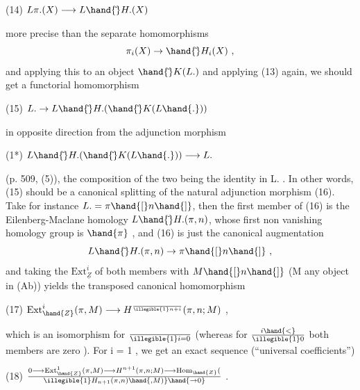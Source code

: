 
(14) \qquad $L\pi.(X) \longrightarrow L\hand{\tilde{}}H.(X)$

more precise than the separate homomorphisms
\[ \pi_i(X) \to \hand{\tilde{}}H_i(X) \ , \]
and applying this to an object $\hand{\tilde{}}K(L.)$ and applying (13) again, we should
get a functorial homomorphism

(15) \qquad $L. \to L\hand{\tilde{}}H.(\hand{\tilde{}}K(L\hand{.}))$

in opposite direction from the adjunction morphism

(1*) \qquad $L\hand{\tilde{}}H.(\hand{\tilde{}}K(L\hand{.})) \longrightarrow L.$

(p. 509, (5)), the composition of the two being the identity in L. .
In other words, (15) should be a canonical splitting of the natural
adjunction morphism (16). Take for instance $L. =\pi\hand{[}n\hand{]}$, then the first
member of (16) is the Eilenberg-Maclane homology $L\hand{\tilde{}}H.(\pi,n)$, whose first
non vanishing homology group is $\hand{\pi}$ , and (16) is just the canonical
augmentation
\[ L\hand{\tilde{}}H.(\pi,n)\to\pi\hand{[}n\hand{]} \ , \]
and taking the $\mathrm{Ext}^i_{\underline{Z}}$ of both members with $M\hand{[}n\hand{]}$ (M any object in (Ab))
yields the transposed canonical homomorphism

(17) \qquad $\mathrm{Ext}^i_{\hand{Z}}(\pi,M) \longrightarrow H^{\over{\illegible{1}}{n+i}}(\pi,n; M)$ \quad ,

which is an isomorphism for $\over{\illegible{1}}{i=0}$ (whereas for $i\hand{<} \over{\illegible{1}}{0}$ both members are
zero ). For i = 1 , we get an exact sequence (``universal coefficients'')

(18) \qquad $0 \longrightarrow \mathrm{Ext}^1_{\hand{Z}}(\pi,M) \longrightarrow H^{n+1}(\pi,n;M) \longrightarrow \mathrm{Hom}_{\hand{Z}}(\over{\illegible{1}}{H_{n+1}}(\pi,n)\hand{, M)} \hand{\to 0}$ .


